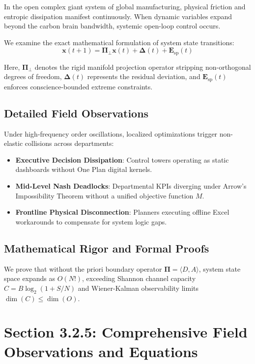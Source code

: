 \documentclass[12pt,a4paper,oneside]{book}
\begin{document}
In the open complex giant system of global manufacturing, physical friction and entropic dissipation manifest continuously. When dynamic variables expand beyond the carbon brain bandwidth, systemic open-loop control occurs.

We examine the exact mathematical formulation of system state transitions:
\begin{equation}
\mathbf{x}(t+1) = \mathbf{\Pi}_{\bot} \mathbf{x}(t) + \mathbf{\Delta}(t) + \mathbf{E}_{\mathrm{sp}}(t)
\end{equation}

Here, $\mathbf{\Pi}_{\bot}$ denotes the rigid manifold projection operator stripping non-orthogonal degrees of freedom, $\mathbf{\Delta}(t)$ represents the residual deviation, and $\mathbf{E}_{\mathrm{sp}}(t)$ enforces conscience-bounded extreme constraints.

\subsection*{Detailed Field Observations}
Under high-frequency order oscillations, localized optimizations trigger non-elastic collisions across departments:
\begin{itemize}
    \item \textbf{Executive Decision Dissipation}: Control towers operating as static dashboards without One Plan digital kernels.
    \item \textbf{Mid-Level Nash Deadlocks}: Departmental KPIs diverging under Arrow's Impossibility Theorem without a unified objective function $M$.
    \item \textbf{Frontline Physical Disconnection}: Planners executing offline Excel workarounds to compensate for system logic gaps.
\end{itemize}

\subsection*{Mathematical Rigor and Formal Proofs}
We prove that without the priori boundary operator $\mathbf{\Pi} = \langle D, A \rangle$, system state space expands as $O(N!)$, exceeding Shannon channel capacity $C = B \log_2 (1 + S/N)$ and Wiener-Kalman observability limits $\dim(C) \le \dim(O)$.
\clearpage
\section{Section 3.2.5: Comprehensive Field Observations and Equations}
\end{document}
